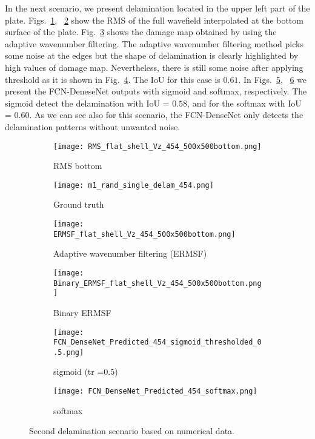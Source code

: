 In the next scenario, we present delamination located in the upper left part of the plate.
Figs.~\ref{fig:dispersion30deg_direct}, ~\ref{fig:m1_rand_single_delam_454} show the RMS of the full wavefield interpolated at the bottom surface of the plate.
Fig.~\ref{fig:ERMSF_flat_shell_Vz_454} shows the damage map obtained by using the adaptive wavenumber filtering.
The adaptive wavenumber filtering method picks some noise at the edges but the shape of delamination is clearly highlighted by high values of damage map.
Nevertheless, there is still some noise after applying threshold as it is shown in Fig.~\ref{fig:Binary_ERMSF}.
The IoU for this case is \(0.61\).
In Figs.~\ref{fig:predict_454_sigmoid_tr_0.5}, ~\ref{fig:predict_454_softmax} we present the FCN-DeneseNet outputs with sigmoid and softmax, respectively.
The sigmoid detect the delamination with IoU = \(0.58\), and for the softmax with IoU = \(0.60\).
As we can see also for this scenario, the FCN-DenseNet only detects the delamination patterns without unwanted noise.
	\begin{figure} [!h]
		\centering
		\begin{subfigure}[b]{0.47\textwidth}
			\centering
			\texttt{[image: RMS\_flat\_shell\_Vz\_454\_500x500bottom.png]}
			\caption{RMS bottom}
			\label{fig:dispersion30deg_direct}
		\end{subfigure}
		\hfill
		\begin{subfigure}[b]{0.47\textwidth}
			\centering
			\texttt{[image: m1\_rand\_single\_delam\_454.png]}
			\caption{Ground truth}
			\label{fig:m1_rand_single_delam_454}
		\end{subfigure}
		\hfill
		\begin{subfigure}[b]{0.47\textwidth}
			\centering
			\texttt{[image: ERMSF\_flat\_shell\_Vz\_454\_500x500bottom.png]}
			\caption{Adaptive wavenumber filtering (ERMSF)}
			\label{fig:ERMSF_flat_shell_Vz_454}
		\end{subfigure}
		\hfill
		\begin{subfigure}[b]{0.47\textwidth}
			\centering
			\texttt{[image: Binary\_ERMSF\_flat\_shell\_Vz\_454\_500x500bottom.png]}
			\caption{Binary ERMSF}
			\label{fig:Binary_ERMSF}
		\end{subfigure}
		\hfill
		\begin{subfigure}[b]{0.47\textwidth}
			\centering
			\texttt{[image: FCN\_DenseNet\_Predicted\_454\_sigmoid\_thresholded\_0.5.png]}
			\caption{sigmoid (tr =\(0.5\))}
			\label{fig:predict_454_sigmoid_tr_0.5}
		\end{subfigure}
		\hfill	
		\begin{subfigure}[b]{0.47\textwidth}
			\centering
			\texttt{[image: FCN\_DenseNet\_Predicted\_454\_softmax.png]}
			\caption{softmax}
			\label{fig:predict_454_softmax}
		\end{subfigure}
		\caption{Second delamination scenario based on numerical data.}
		\label{fig:RMS454}
	\end{figure} 
